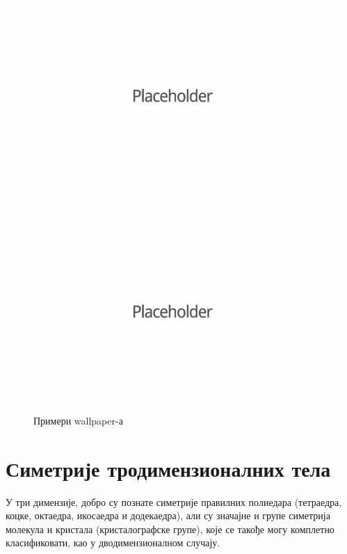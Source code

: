 \documentclass{report}
\theoremstyle{plain}
\theoremstyle{definition}
\begin{document}
\begin{figure}[h]
\centering
\begin{subfigure}{0.4\textwidth}
\includegraphics[width=\textwidth]{placeholder}
\end{subfigure}
~
\begin{subfigure}{0.4\textwidth}
\includegraphics[width=\textwidth]{placeholder}
\end{subfigure}
\caption{Примери wallpaper-а}
\end{figure}

\section{Симетрије тродимензионалних тела}
У три димензије, добро су познате симетрије правилних полиедара (тетраедра, коцке, октаедра, икосаедра и додекаедра), али су значајне и групе симетрија молекула и кристала (кристалографске групе), које се такође могу комплетно класификовати, као у дводимензионалном случају.
\end{document}
